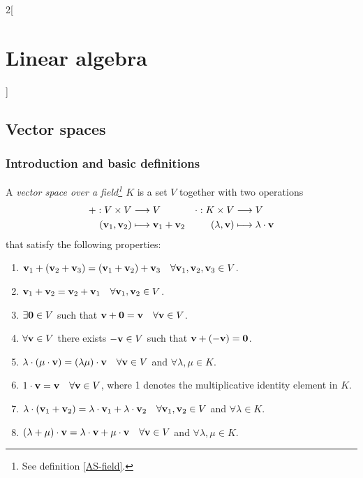 \documentclass[../../../main.tex]{subfiles}
\begin{document}
\begin{multicols}{2}[\section{Linear algebra}]
  \subsection{Vector spaces}
  \subsubsection*{Introduction and basic definitions}
  \begin{definition}
    A \textit{vector space over a field\footnote{See definition \ref{AS-field}.} $K$} is a set $V$ together with two operations
    \begin{align*}
      +:V\times V                       & \longrightarrow V                            & \cdot:K\times V         & \longrightarrow V                      \\
      (\vb{v}_1,\vb{v}_2) & \longmapsto \vb{v}_1+ \vb{v}_2 & (\lambda,\vb{v}) & \longmapsto \lambda\cdot \vb{v}
    \end{align*}
    that satisfy the following properties:
    \begin{enumerate}
      \item $\vb{v}_1+(\vb{v}_2+\vb{v}_3)=(\vb{v}_1+\vb{v}_2)+\vb{v}_3\quad\forall\vb{v}_1,\vb{v}_2,\vb{v}_3\in V$.
      \item $\vb{v}_1+\vb{v}_2=\vb{v}_2+\vb{v}_1\quad\forall\vb{v}_1,\vb{v}_2\in V$.
      \item $\exists\vb{0}\in V$ such that $\vb{v}+\vb{0}=\vb{v}\quad\forall\vb{v}\in V$.
      \item $\forall\vb{v}\in V$ there exists $-\vb{v}\in V$ such that $\vb{v}+(-\vb{v})=\vb{0}$.
      \item $\lambda\cdot(\mu\cdot\vb{v})=(\lambda\mu)\cdot\vb{v}\quad\forall\vb{v}\in V$ and $\forall\lambda,\mu\in K$.
      \item $1\cdot\vb{v}=\vb{v}\quad\forall\vb{v}\in V$, where 1 denotes the multiplicative identity element in $K$.
      \item $\lambda\cdot(\vb{v}_1+\vb{v}_2)=\lambda\cdot\vb{v}_1+\lambda\cdot\vb{v}_2\quad\forall\vb{v}_1,\vb{v}_2\in V$ and $\forall\lambda\in K$.
      \item $(\lambda+\mu)\cdot\vb{v}=\lambda\cdot\vb{v}+\mu\cdot\vb{v}\quad\forall\vb{v}\in V$ and $\forall\lambda,\mu\in K$.

\end{enumerate}
\end{definition}
\end{multicols}
\end{document}
